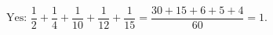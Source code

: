 $\boxed{\text{Yes}}$: $\dfrac12+\dfrac14+\dfrac1{10}+\dfrac1{12}+\dfrac1{15}=\dfrac{30+15+6+5+4}{60}=1$.
